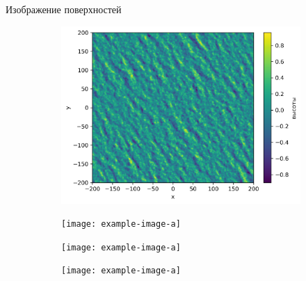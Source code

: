 \documentclass[10pt,pdf,hyperref={unicode}, dvipsnames]{beamer}
\begin{document}
\begin{frame}[t]{Изображение поверхностей}
    \begin{figure}[h]
        \begin{subfigure}{0.49\linewidth}
            \centering
            \includegraphics[width=1\linewidth]{img/heights5.png}
        \end{subfigure}
        \begin{subfigure}{0.49\linewidth}
            \centering
            \texttt{[image: example-image-a]}
        \end{subfigure}
        \begin{subfigure}{0.49\linewidth}
            \centering
            \texttt{[image: example-image-a]}
        \end{subfigure}
        \begin{subfigure}{0.49\linewidth}
            \centering
            \texttt{[image: example-image-a]}
        \end{subfigure}
    \end{figure}    
\end{frame}
\end{document}
